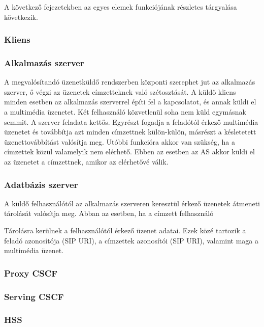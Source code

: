 A következő fejezetekben az egyes elemek funkciójának részletes tárgyalása következik.

\subsubsection{Kliens}
\label{sec:kliens_pc}


\subsubsection{Alkalmazás szerver}
A megvalósítandó üzenetküldő rendszerben központi szerephet jut az alkalmazás szerver, ő végzi az üzenetek címzetteknek való szétosztását. A küldő kliens minden esetben az alkalmazás szerverrel építi fel a kapcsolatot, és annak küldi el a multimédia üzenetet. Két felhasználó közvetlenül soha nem küld egymásnak semmit. A szerver feladata kettős. Egyrészt fogadja a feladótól érkező multimédia üzenetet és továbbítja azt minden címzettnek külön-külön, másrészt a késletetett üzenettovábbítást valósítja meg. Utóbbi funkcióra akkor van szükség, ha a címzettek közül valamelyik nem elérhető. Ebben az esetben az AS akkor küldi el az üzenetet a címzettnek, amikor az elérhetővé válik.

\subsubsection{Adatbázis szerver}
\label{sec:adatbszerver}

A küldő felhasználótól az alkalmazás szerveren keresztül érkező üzenetek átmeneti tárolását valósítja meg. Abban az esetben, ha a címzett felhasználó 

Tárolásra kerülnek a felhasználótól érkező üzenet adatai. Ezek közé tartozik
a feladó azonosítója (SIP URI), a címzettek azonosítói (SIP URI), valamint maga a multimédia üzenet.

\subsubsection{Proxy CSCF}
\label{sec:p_cscf}

\subsubsection{Serving CSCF}
\label{sec:s_cscf}

\subsubsection{HSS}
\label{sec:hss}

